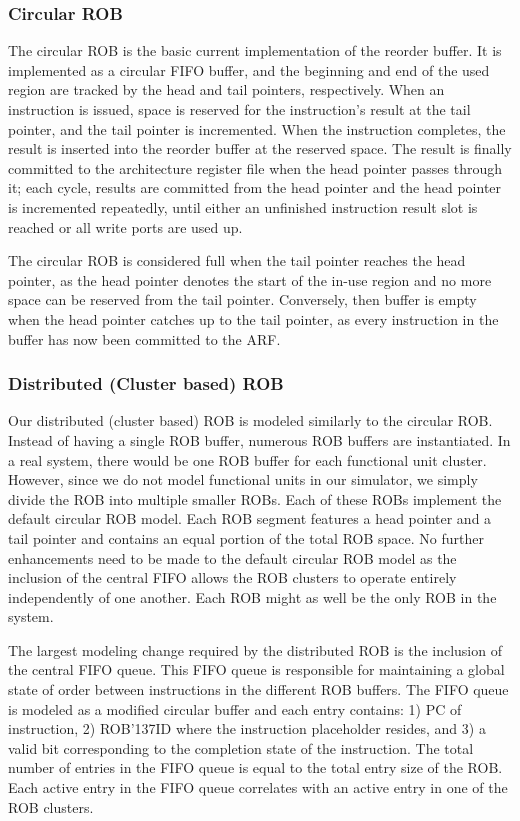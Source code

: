 \subsubsection{Circular ROB}
\label{sec:circ}
The circular ROB is the basic current implementation of the reorder buffer. It is implemented as a circular FIFO buffer, and the beginning and end of the used region are tracked by the head and tail pointers, respectively. When an instruction is issued, space is reserved for the instruction's result at the tail pointer, and the tail pointer is incremented. When the instruction completes, the result is inserted into the reorder buffer at the reserved space. The result is finally committed to the architecture register file when the head pointer passes through it; each cycle, results are committed from the head pointer and the head pointer is incremented repeatedly, until either an unfinished instruction result slot is reached or all write ports are used up.

The circular ROB is considered full when the tail pointer reaches the head pointer, as the head pointer denotes the start of the in-use region and no more space can be reserved from the tail pointer. Conversely, then buffer is empty when the head pointer catches up to the tail pointer, as every instruction in the buffer has now been committed to the ARF.

\subsubsection{Distributed (Cluster based) ROB}
Our distributed (cluster based) ROB is modeled similarly to the circular ROB.  Instead of having a single ROB buffer, 
numerous ROB buffers are instantiated.  In a real system, there would be one ROB buffer for each functional 
unit cluster.  However, since we do not model functional units in our simulator, we simply divide the ROB 
into multiple smaller ROBs.  Each of these ROBs implement the default circular ROB model.  Each ROB segment 
features a head pointer and a tail pointer and contains an equal portion of the total ROB space.  No further 
enhancements need to be made to the default circular ROB model as the inclusion of the central FIFO allows the 
ROB clusters to operate entirely independently of one another.  Each ROB might as well be the only ROB in the system. 

The largest modeling change required by the distributed ROB is the inclusion of the central FIFO queue.  This 
FIFO queue is responsible for maintaining a global state of order between instructions in the different ROB buffers. 
The FIFO queue is modeled as a modified circular buffer and each entry contains: 1) PC of instruction, 
2) ROB{\char'137}ID where the instruction placeholder resides, and 3) a valid bit corresponding to the completion state of 
the instruction.  The total number of entries in the FIFO queue is equal to the total entry size of the ROB.  
Each active entry in the FIFO queue correlates with an active entry in one of the ROB clusters.  


